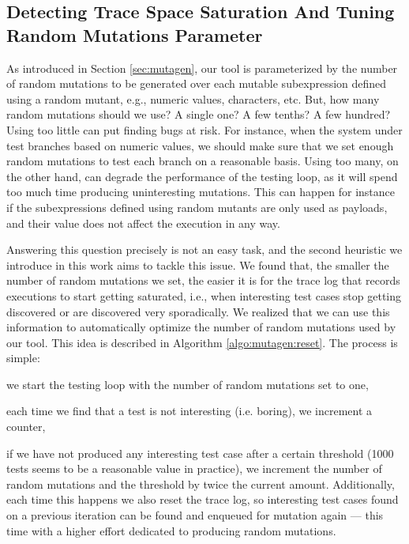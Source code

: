 \documentclass[sigconf, anonymous]{acmart}
\newcommand{\mutagen}{\textsc{Mutagen}\xspace}
\begin{document}


\subsection{Detecting Trace Space Saturation And Tuning Random Mutations Parameter}

As introduced in Section \ref{sec:mutagen}, our tool is parameterized by the
number of random mutations to be generated over each mutable subexpression
defined using a random mutant, e.g., numeric values, characters, etc.
%
But, how many random mutations should we use? A single one? A few tenths? A few
hundred?
%
Using too little can put finding bugs at risk.
%
For instance, when the system under test branches based on numeric values, we
should make sure that we set enough random mutations to test each branch on a
reasonable basis.
%
Using too many, on the other hand, can degrade the performance of the testing
loop, as it will spend too much time producing uninteresting mutations.
%
This can happen for instance if the subexpressions defined using random mutants
are only used as payloads, and their value does not affect the execution in any
way.


Answering this question precisely is not an easy task, and the second heuristic
we introduce in this work aims to tackle this issue.
%
We found that, the smaller the number of random mutations we set, the easier it
is for the trace log that records executions to start getting saturated, i.e.,
when interesting test cases stop getting discovered or are discovered very
sporadically.
%
We realized that we can use this information to automatically optimize the
number of random mutations used by our tool.
%
This idea is described in Algorithm \ref{algo:mutagen:reset}.
%
The process is simple:
%
\begin{inparaenum}
  \item we start the testing loop with the number of random mutations set to
    one,
  \item each time we find that a test is not interesting (i.e. boring), we
    increment a counter,
  \item if we have not produced any interesting test case after a certain
    threshold (1000 tests seems to be a reasonable value in practice), we
    increment the number of random mutations and the threshold by twice the
    current amount.
    Additionally, each time this happens we also reset the trace log, so
    interesting test cases found on a previous iteration can be found and
    enqueued for mutation again --- this time with a higher effort dedicated to
    producing random mutations.
\end{inparaenum}
\end{document}

